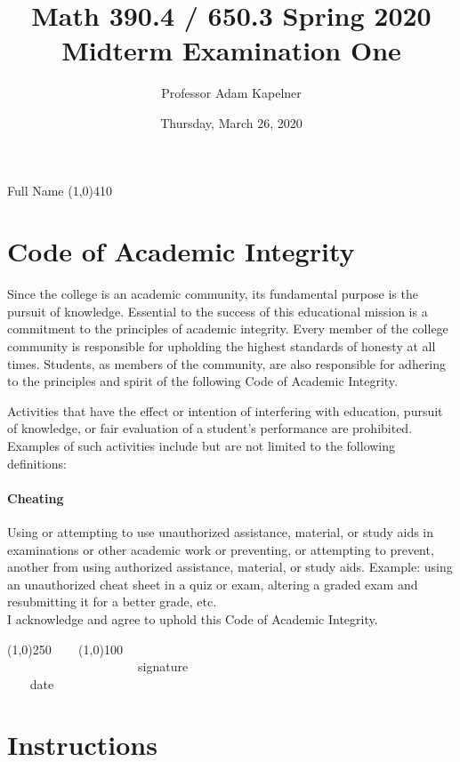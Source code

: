 \documentclass[12pt]{article}
\title{Math 390.4 / 650.3 Spring 2020 \\ Midterm Examination One}
\author{Professor Adam Kapelner}
\date{Thursday, March 26, 2020}
\begin{document}
\maketitle

\noindent Full Name \line(1,0){410}

\thispagestyle{empty}

\section*{Code of Academic Integrity}

\footnotesize
Since the college is an academic community, its fundamental purpose is the pursuit of knowledge. Essential to the success of this educational mission is a commitment to the principles of academic integrity. Every member of the college community is responsible for upholding the highest standards of honesty at all times. Students, as members of the community, are also responsible for adhering to the principles and spirit of the following Code of Academic Integrity.

Activities that have the effect or intention of interfering with education, pursuit of knowledge, or fair evaluation of a student's performance are prohibited. Examples of such activities include but are not limited to the following definitions:

\paragraph{Cheating} Using or attempting to use unauthorized assistance, material, or study aids in examinations or other academic work or preventing, or attempting to prevent, another from using authorized assistance, material, or study aids. Example: using an unauthorized cheat sheet in a quiz or exam, altering a graded exam and resubmitting it for a better grade, etc.
\\

\noindent I acknowledge and agree to uphold this Code of Academic Integrity. \\

\begin{center}
\line(1,0){250} ~~~ \line(1,0){100}\\
~~~~~~~~~~~~~~~~~~~~~signature~~~~~~~~~~~~~~~~~~~~~~~~~~~~~~~~~~~~~~~~~~~~~ date
\end{center}

\normalsize

\section*{Instructions}
\end{document}
